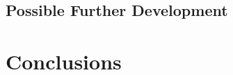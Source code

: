 \documentclass[12pt]{article}
\begin{document}


\subsection{Possible Further Development} %
\label{sub:possible_further_development}


\section{Conclusions} %
\label{sec:conclusions}

\end{document}

